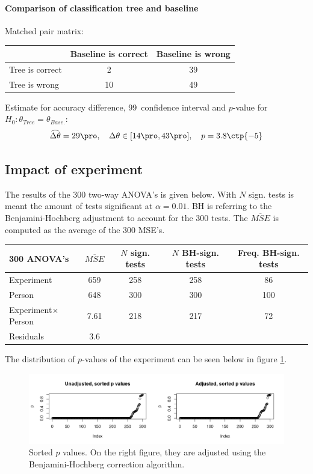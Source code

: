 \documentclass[11pt,fleqn]{article}
\begin{document}
\paragraph{Comparison of classification tree and baseline}
Matched pair matrix:

\begin{table}[H]
	\centering
	\begin{tabular}{l|c c}
		&Baseline is correct& Baseline is wrong \\
		\hline
		Tree is correct &2& 39\\
		Tree is wrong& 10& 49
	\end{tabular}
\end{table}\noindent 
Estimate for accuracy difference, 99\pro\ confidence interval and \(p\)-value for \(H_0: \theta_{Tree}=\theta_{Base.}\):
\[
\widehat{\Delta \theta} = 29\pro,\quad  \Delta \theta\in[14\pro , 43\pro], \quad p = 3.8\ctp{-5}
\]

\subsection{Impact of experiment}
The results of the 300 two-way ANOVA's is given below. With \(N\) sign. tests is meant the amount of tests significant at \(\alpha = 0.01\). BH is referring to the Benjamini-Hochberg adjustment to account for the 300 tests. The \(\overline{ MSE}\) is computed as the average of the 300 MSE's.
\begin{table}[H]
	\centering
	\begin{tabular}{l | c c c c}
		300 ANOVA's & \(\overline{MSE}\) & \(N\) sign. tests& \(N\) BH-sign. tests& Freq. BH-sign. tests\\
		\hline 
		Experiment  & 659 	& 258 & 258 	& 86\pro	\\
		Person  & 648 		&  300 & 300	&100\pro  \\
		Experiment\(\times\)Person&7.61  & 218 & 217 &	72\pro	\\
		Residuals &3.6 &			
	\end{tabular}
	\label{tab:ranova}
\end{table}\noindent
The distribution of \(p\)-values of the experiment can be seen below in figure \ref{fig:sortp}.
\begin{figure}[H]
	\centering
	\includegraphics[width=.8\textwidth]{pvalues}
	\caption{Sorted $ p $ values. On the right figure, they are adjusted using the Benjamini-Hochberg correction algorithm.}\label{fig:sortp}
\end{figure}
\end{document}
